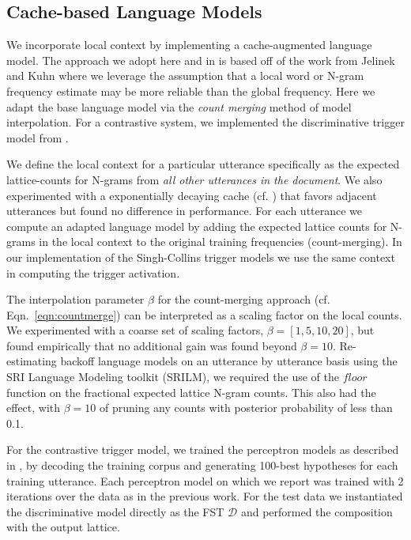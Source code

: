 
\subsection{Cache-based Language Models}

We incorporate local context by implementing a cache-augmented language model. The approach we adopt here and in \cite{wintrode2014slta} is based off of the work from Jelinek \cite{jelinek1991} and Kuhn \cite{kuhn1990} where we leverage the assumption that a local word or N-gram frequency estimate may be more reliable than the global frequency. Here we adapt the base language model via the \textit{count merging} method of model interpolation.  For a contrastive system, we implemented the discriminative trigger model from \cite{singh2007trigger}.    

We define the local context for a particular utterance specifically as the expected lattice-counts for N-grams from \textit{all other utterances in the document}.  We also experimented with a exponentially decaying cache (cf. \cite{clarkson1997}) that favors adjacent utterances but found no difference in performance.  For each utterance we compute an adapted language model by adding the expected lattice counts for N-grams in the local context to the original training frequencies (count-merging).  In our implementation of the Singh-Collins trigger models we use the same context in computing the trigger activation.


The interpolation parameter $\beta$ for the count-merging approach (cf. Eqn.~\ref{eqn:countmerge}) can be interpreted as a scaling factor on the local counts.   We experimented with a coarse set of scaling factors, $\beta=[1,5,10,20]$, but found empirically that no additional gain was found beyond $\beta=10$.  Re-estimating backoff language models on an utterance by utterance basis using the SRI Language Modeling toolkit\cite{srilm} (SRILM), we required the use of the $floor$ function on the fractional expected lattice N-gram counts.  This also had the effect, with $\beta=10$ of pruning any counts with posterior probability of less than 0.1. 

For the contrastive trigger model, we trained the perceptron models as described in \cite{roark2004discriminative}, by decoding the training corpus and generating 100-best hypotheses for each training utterance.  Each perceptron model on which we report was trained with 2 iterations over the data as in the previous work.  For the test data we instantiated the discriminative model directly as the FST $\mathcal{D}$ and performed the composition with the output lattice.

